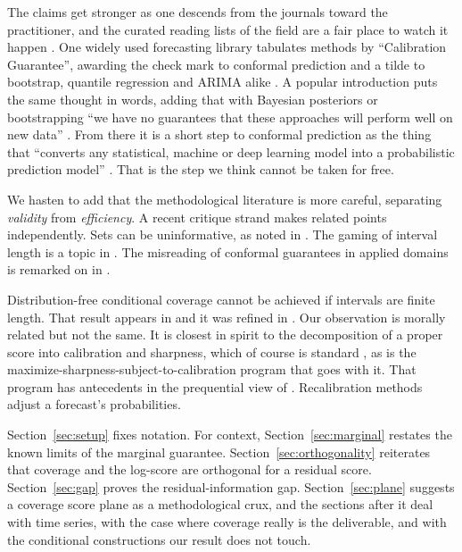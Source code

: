 \documentclass[11pt]{article}
\theoremstyle{definition}
\begin{document}
The claims get stronger as one descends from the journals toward the practitioner, and the
curated reading lists of the field are a fair place to watch it happen
\citep{awesome_conformal}. One widely used forecasting library tabulates methods by
``Calibration Guarantee'', awarding the check mark to conformal prediction and a tilde to
bootstrap, quantile regression and ARIMA alike \citep{nixtla_conformal}. A popular
introduction puts the same thought in words, adding that with Bayesian posteriors or
bootstrapping ``we have no guarantees that these approaches will perform well on new data''
\citep{molnar_conformal}. From there it is a short step to conformal prediction as the thing
that ``converts any statistical, machine or deep learning model into a probabilistic
prediction model'' \citep{manokhin_neuralprophet}. That is the step we think cannot be taken
for free.

We hasten to add that the methodological literature is more careful,
separating \emph{validity} from \emph{efficiency}. A recent critique strand makes related points independently. Sets can be uninformative, as noted in \citet{recht2024cover}. The gaming
of interval length is a topic in \citet{min2026coveragelength}. The misreading of conformal guarantees in applied domains is remarked
on in \citet{pitfalls2025medical}.

Distribution-free conditional coverage cannot be achieved if intervals are finite length.
That result appears in \citet{lei2014distribution} and it was refined in
\citet{barber2021limits}. Our observation is morally related but not the same. It is closest in spirit to
the decomposition of a proper score into calibration and sharpness, which of course is standard
\citep{gneiting2007probabilistic,gneiting2007strictly}, as is the
maximize-sharpness-subject-to-calibration program that goes with it. That program has
antecedents in the prequential view of \citet{dawid1984present}. Recalibration methods
\citep{platt1999probabilistic,zadrozny2002transforming,guo2017calibration,kuleshov2018accurate}
adjust a forecast's probabilities.

Section~\ref{sec:setup} fixes notation. For context, Section~\ref{sec:marginal} restates
the known limits of the marginal guarantee. Section~\ref{sec:orthogonality} reiterates
that coverage and the log-score are orthogonal for a residual score.
Section~\ref{sec:gap} proves the residual-information gap. Section~\ref{sec:plane}
suggests a coverage score plane as a methodological crux, and the sections after it deal
with time series, with the case where coverage really is the deliverable, and with the
conditional constructions our result does not touch.
\end{document}
